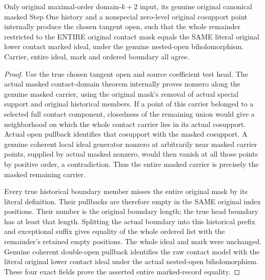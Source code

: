\begin{lemma}
\label{hir:original-all-level-contact-remainder-entire-initial-mask}
\leanok
{}
Only original maximal-order domain-$k+2$ input, its genuine original canonical
masked Step One history and a nonspecial zero-level original cosupport point
internally produce the chosen tangent open, such that the whole remainder
restricted to the ENTIRE original contact mask equals the SAME literal
original lower contact marked ideal, under the genuine nested-open
biholomorphism. Carrier, entire ideal, mark and ordered boundary all agree.
\end{lemma}
\begin{proof}
Use the true chosen tangent open and source coefficient test head. The actual
masked contact-domain theorem internally proves nonzero along the genuine
masked carrier, using the original mask's removal of actual special support
and original historical members. If a point of this carrier belonged to a
selected full contact component, closedness of the remaining union would give
a neighborhood on which the whole contact carrier lies in its actual
cosupport. Actual open pullback identifies that cosupport with the masked
cosupport. A genuine coherent local ideal generator nonzero at arbitrarily
near masked carrier points, supplied by actual masked nonzero, would then
vanish at all those points by positive order, a contradiction. Thus the entire
masked carrier is precisely the masked remaining carrier.

Every true historical boundary member misses the entire original mask by its
literal definition. Their pullbacks are therefore empty in the SAME original
index positions. Their number is the original boundary length; the true head
boundary has at least that length. Splitting the actual boundary into this
historical prefix and exceptional suffix gives equality of the whole ordered
list with the remainder's retained empty positions. The whole ideal and mark
were unchanged. Genuine coherent double-open pullback identifies the raw
contact model with the literal original lower contact ideal under the actual
nested-open biholomorphism. These four exact fields prove the asserted entire
marked-record equality.
\end{proof}

